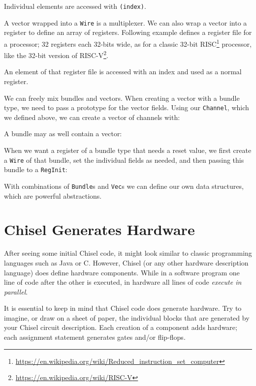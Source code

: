\documentclass[%
    10pt,
    headinclude, footexclude,
    openright, %
    notitlepage,
    cleardoubleempty,
    headsepline,
    pointlessnumbers,
    bibtotoc, idxtotoc,
    ]{scrbook}
\newcommand{\code}[1]{{\small{\texttt{#1}}}}
\newcommand{\myref}[2]{\href{#1}{#2}}
\renewcommand{\myref}[2]{{#2}{\footnote{\url{#1}}}}
\begin{document}

\noindent Individual elements are accessed with \code{(index)}.


A vector wrapped into a \code{Wire} is a multiplexer.
We can also wrap a vector into a register to define an array of registers.
Following example defines a register file for a processor; 32 registers
each 32-bits wide, as for a classic 32-bit 
\myref{https://en.wikipedia.org/wiki/Reduced_instruction_set_computer}{RISC}
processor, like the 32-bit version of \myref{https://en.wikipedia.org/wiki/RISC-V}{RISC-V}.


\noindent An element of that register file is accessed with an index and used as a normal register.


We can freely mix bundles and vectors. When creating a vector with a bundle
type, we need to pass a prototype for the vector fields. Using our
\code{Channel}, which we defined above, we can create a vector of channels with:


\noindent A bundle may as well contain a vector:


When we want a register of a bundle type that needs a reset value,
we first create a \code{Wire} of that bundle, set the individual fields
as needed, and then passing this bundle to a \code{RegInit}:


With combinations of \code{Bundle}s and \code{Vec}s we can define our own data
structures, which are powerful abstractions.

\section{Chisel Generates Hardware}

After seeing some initial Chisel code, it might look similar to classic programming
languages such as Java or C. However, Chisel (or any other hardware description
language) does define hardware components. While in a software program one
line of code after the other is executed, in hardware all lines of code
\emph{execute in parallel}.

It is essential to keep in mind that Chisel code does generate hardware.
Try to imagine, or draw on a sheet of paper, the individual blocks that
are generated by your Chisel circuit description.
Each creation of a component adds hardware; each assignment statement
generates gates and/or flip-flops.
\end{document}
